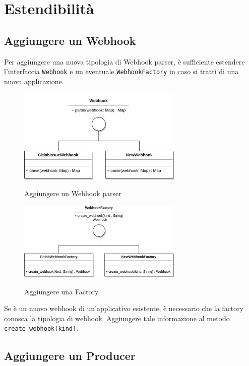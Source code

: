 \section{Estendibilità}

\subsection{Aggiungere un Webhook}

Per aggiungere una nuova tipologia di Webhook parser, è sufficiente estendere l'interfaccia \texttt{Webhook}
e un eventuale \texttt{WebhookFactory} in caso si tratti di una nuova applicazione.

\begin{figure}[H]
    \centering
    \includegraphics[width=0.7\textwidth]{img/EstensioneWebhook-Webhook.png}\\
    \caption{Aggiungere un Webhook parser}
\end{figure}


\begin{figure}[H]
    \centering
    \includegraphics[width=0.7\textwidth]{img/EstensioneWebhook-Factory.png}\\
    \caption{Aggiungere una Factory}
\end{figure}

Se è un nuovo webhook di un'applicativo esistente, è necessario che la factory conosca la tipologia di webhook.
Aggiungere tale informazione al metodo \texttt{create\_webhook(kind)}.


\subsection{Aggiungere un Producer}

